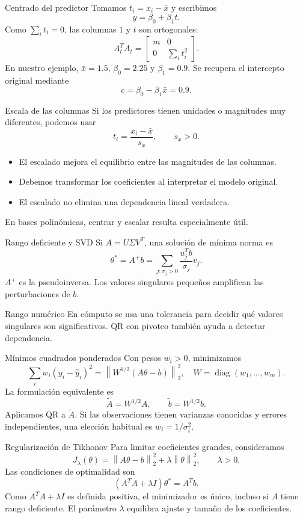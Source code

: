 \documentclass[aspectratio=169,12pt]{beamer}
\newcommand{\mat}[1]{\begin{bmatrix}#1\end{bmatrix}}
\newcommand{\norm}[1]{\left\lVert#1\right\rVert}
\begin{document}
\begin{frame}{Centrado del predictor}
Tomamos $t_i=x_i-\bar x$ y escribimos
\[
\widehat y=\beta_0+\beta_1t.
\]
Como $\sum_i t_i=0$, las columnas $1$ y $t$ son ortogonales:
\[
A_t^TA_t=\mat{m&0\\0&\sum_i t_i^2}.
\]
En nuestro ejemplo, $\bar x=1.5$, $\beta_0=2.25$ y $\beta_1=0.9$.
Se recupera el intercepto original mediante
\[
c=\beta_0-\beta_1\bar x=0.9.
\]
\end{frame}

\begin{frame}{Escala de las columnas}
Si los predictores tienen unidades o magnitudes muy diferentes, podemos usar
\[
t_i=\frac{x_i-\bar x}{s_x},\qquad s_x>0.
\]
\begin{itemize}
\item El escalado mejora el equilibrio entre las magnitudes de las columnas.
\item Debemos transformar los coeficientes al interpretar el modelo original.
\item El escalado no elimina una dependencia lineal verdadera.
\end{itemize}
En bases polinómicas, centrar y escalar resulta especialmente útil.
\end{frame}

\begin{frame}{Rango deficiente y SVD}
Si $A=U\Sigma V^T$, una solución de mínima norma es
\[
\theta^*=A^+b
=\sum_{j:\sigma_j>0}\frac{u_j^Tb}{\sigma_j}v_j.
\]
$A^+$ es la pseudoinversa. Los valores singulares pequeños amplifican las
perturbaciones de $b$.
\begin{block}{Rango numérico}
En cómputo se usa una tolerancia para decidir qué valores singulares son
significativos. QR con pivoteo también ayuda a detectar dependencia.
\end{block}
\end{frame}

\begin{frame}{Mínimos cuadrados ponderados}
Con pesos $w_i>0$, minimizamos
\[
\sum_i w_i(y_i-\widehat y_i)^2
=\norm{W^{1/2}(A\theta-b)}_2^2,
\quad W=\operatorname{diag}(w_1,\ldots,w_m).
\]
La formulación equivalente es
\[
\widetilde A=W^{1/2}A,\qquad \widetilde b=W^{1/2}b.
\]
Aplicamos QR a $\widetilde A$.
Si las observaciones tienen varianzas conocidas y errores independientes,
una elección habitual es $w_i=1/\sigma_i^2$.
\end{frame}

\begin{frame}{Regularización de Tikhonov}
Para limitar coeficientes grandes, consideramos
\[
J_\lambda(\theta)=\norm{A\theta-b}_2^2+\lambda\norm{\theta}_2^2,
\qquad\lambda>0.
\]
Las condiciones de optimalidad son
\[
(A^TA+\lambda I)\theta^*=A^Tb.
\]
Como $A^TA+\lambda I$ es definida positiva, el minimizador es único,
incluso si $A$ tiene rango deficiente.
El parámetro $\lambda$ equilibra ajuste y tamaño de los coeficientes.
\end{frame}
\end{document}
